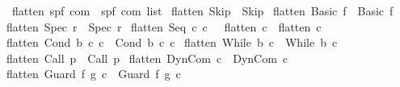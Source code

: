 \begin{isabellebody}
\endisatagproof
{\isafoldproof}%
%
\isadelimproof
%
\endisadelimproof
%
\isamarkuptrue%
%
\isamarkuptrue%
\isamarkupfalse%
\ flatten{\isacharcolon}{\isacharcolon}\ {\isachardoublequoteopen}{\isacharparenleft}{\isacharprime}s{\isacharcomma}{\isacharprime}p{\isacharcomma}{\isacharprime}f{\isacharparenright}\ com\ {\isasymRightarrow}\ {\isacharparenleft}{\isacharprime}s{\isacharcomma}{\isacharprime}p{\isacharcomma}{\isacharprime}f{\isacharparenright}\ com\ list{\isachardoublequoteclose}\ \isanewline
{}\isanewline
{\isachardoublequoteopen}flatten\ Skip\ {\isacharequal}\ {\isacharbrackleft}Skip{\isacharbrackright}{\isachardoublequoteclose}\ {\isacharbar}\isanewline
{\isachardoublequoteopen}flatten\ {\isacharparenleft}Basic\ f{\isacharparenright}\ {\isacharequal}\ {\isacharbrackleft}Basic\ f{\isacharbrackright}{\isachardoublequoteclose}\ {\isacharbar}\isanewline
{\isachardoublequoteopen}flatten\ {\isacharparenleft}Spec\ r{\isacharparenright}\ {\isacharequal}\ {\isacharbrackleft}Spec\ r{\isacharbrackright}{\isachardoublequoteclose}\ {\isacharbar}\isanewline
{\isachardoublequoteopen}flatten\ {\isacharparenleft}Seq\ c\ c\ \ {\isacharequal}\ flatten\ c\ {\isacharat}\ flatten\ c\ {\isacharbar}\isanewline
{\isachardoublequoteopen}flatten\ {\isacharparenleft}Cond\ b\ c\ c\ {\isacharequal}\ {\isacharbrackleft}Cond\ b\ c\ c\ {\isacharbar}\isanewline
{\isachardoublequoteopen}flatten\ {\isacharparenleft}While\ b\ c{\isacharparenright}\ {\isacharequal}\ {\isacharbrackleft}While\ b\ c{\isacharbrackright}{\isachardoublequoteclose}\ {\isacharbar}\isanewline
{\isachardoublequoteopen}flatten\ {\isacharparenleft}Call\ p{\isacharparenright}\ {\isacharequal}\ {\isacharbrackleft}Call\ p{\isacharbrackright}{\isachardoublequoteclose}\ {\isacharbar}\isanewline
{\isachardoublequoteopen}flatten\ {\isacharparenleft}DynCom\ c{\isacharparenright}\ {\isacharequal}\ {\isacharbrackleft}DynCom\ c{\isacharbrackright}{\isachardoublequoteclose}\ {\isacharbar}\isanewline
{\isachardoublequoteopen}flatten\ {\isacharparenleft}Guard\ f\ g\ c{\isacharparenright}\ {\isacharequal}\ {\isacharbrackleft}Guard\ f\ g\ c{\isacharbrackright}{\isachardoublequoteclose}\ {\isacharbar}\isanewline

\end{isabellebody}
